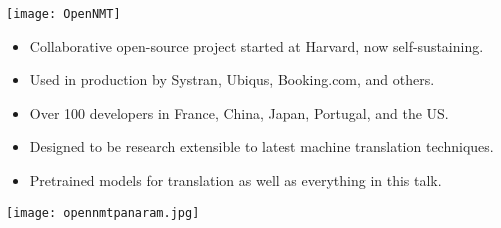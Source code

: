 \begin{frame}
  \begin{center}
    \texttt{[image: OpenNMT]}
  \end{center}

  \begin{itemize}
  \item Collaborative open-source project started at Harvard, now self-sustaining.
    \air 
  \item Used in production by Systran, Ubiqus, Booking.com, and others.
    \air
  \item Over 100 developers in France, China, Japan, Portugal, and the US.
    \air
  \item Designed to be research extensible to latest machine translation techniques. 
    \air

  \item Pretrained models for translation as well as everything in this talk.
  \end{itemize}
\end{frame}

\begin{frame}
  \begin{center}
    \hspace*{-9cm}\texttt{[image: opennmtpanaram.jpg]}
  \end{center}
\end{frame}
